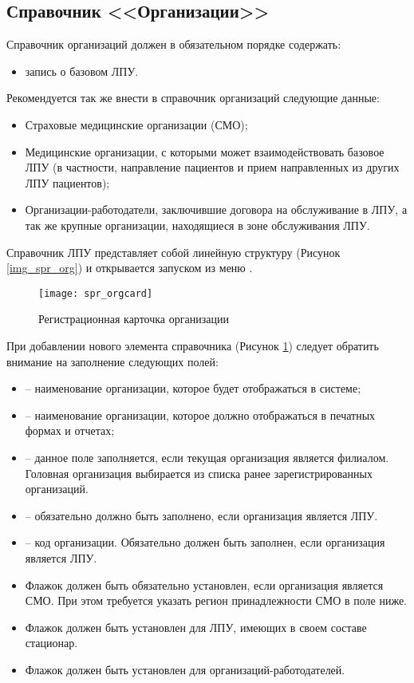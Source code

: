 \subsection{Справочник <<Организации>>}

Справочник организаций должен в обязательном порядке содержать:
\begin{itemize}
 \item 	запись о базовом ЛПУ.
\end{itemize}

Рекомендуется так же внести в справочник организаций следующие данные:
\begin{itemize}
 \item Страховые медицинские организации (СМО);
 \item Медицинские организации, с которыми может взаимодействовать базовое ЛПУ (в частности, направление пациентов и прием направленных из других ЛПУ пациентов);
 \item Организации-работодатели, заключившие договора на обслуживание в ЛПУ, а так же крупные организации, находящиеся в зоне обслуживания ЛПУ.
\end{itemize}

Справочник ЛПУ представляет собой линейную структуру (Рисунок \ref{img_spr_org}) и открывается запуском из меню .
 
\begin{figure}[ht]\centering
 \texttt{[image: spr\_orgcard]}
 \caption{Регистрационная карточка организации}
 \label{img_spr_orgcard}
\end{figure} 

При добавлении нового элемента справочника (Рисунок \ref{img_spr_orgcard}) следует обратить внимание на заполнение следующих полей:
\begin{itemize}
 \item {} – наименование организации, которое будет отображаться в системе;
 \item {} – наименование организации, которое должно отображаться в печатных формах и отчетах;
 \item {} – данное поле заполняется, если текущая организация является филиалом. Головная организация выбирается из списка ранее зарегистрированных организаций.
 \item {} – обязательно должно быть заполнено, если организация является ЛПУ.
 \item {} – код организации. Обязательно должен быть заполнен, если организация является ЛПУ.
 \item Флажок  должен быть обязательно установлен, если организация является СМО. При этом требуется указать регион принадлежности СМО в поле ниже.
 \item Флажок  должен быть установлен для ЛПУ, имеющих в своем составе стационар.
 \item Флажок  должен быть установлен для организаций-работодателей.
\end{itemize}

